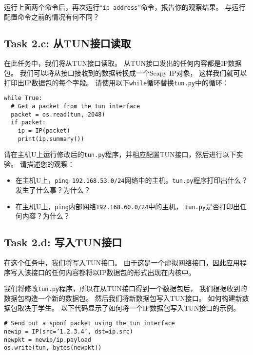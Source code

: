 运行上面两个命令后，再次运行“\verb|ip address|”命令，报告你的观察结果。
与运行配置命令之前的情况有何不同？

\subsection{Task 2.c: 从TUN接口读取}

在此任务中，我们将从TUN接口读取。 
从TUN接口发出的任何内容都是IP数据包。 
我们可以将从接口接收到的数据转换成一个Scapy IP对象，
这样我们就可以打印出IP数据包的每个字段。 
请使用以下\verb|while|循环替换\verb|tun.py|中的循环：

\begin{lstlisting}
while True:
  # Get a packet from the tun interface
  packet = os.read(tun, 2048)
  if packet:
    ip = IP(packet)
    print(ip.summary())
\end{lstlisting}

请在主机U上运行修改后的\verb|tun.py|程序，并相应配置TUN接口，然后进行以下实验。 
请描述您的观察：

\begin{itemize}
\item 在主机U上，\verb|ping 192.168.53.0/24|网络中的主机。\verb|tun.py|程序打印出什么？
发生了什么事？为什么？
\item 在主机U上，\verb|ping|内部网络\verb|192.168.60.0/24|中的主机，
\verb|tun.py|是否打印出任何内容？为什么？
\end{itemize}

\subsection{Task 2.d: 写入TUN接口}

在这个任务中，我们将写入TUN接口。 
由于这是一个虚拟网络接口，因此应用程序写入该接口的任何内容都将以IP数据包的形式出现在内核中。

我们将修改\verb|tun.py|程序，所以在从TUN接口得到一个数据包后，
我们根据收到的数据包构造一个新的数据包。 
然后我们将新数据包写入TUN接口。 
如何构建新数据包取决于学生。 
以下代码显示了如何将一个IP数据包写入TUN接口的示例。

\begin{lstlisting}
# Send out a spoof packet using the tun interface
newip = IP(src=’1.2.3.4’, dst=ip.src)
newpkt = newip/ip.payload
os.write(tun, bytes(newpkt))
\end{lstlisting}


